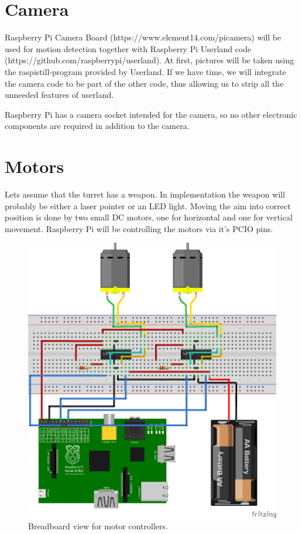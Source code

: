 \documentclass[english,11pt,twoside,a4paper]{article}
\begin{document}
\section{Camera}
Raspberry Pi Camera Board (https://www.element14.com/picamera) will be used for motion detection together with Raspberry Pi Userland code (https://github.com/raspberrypi/userland). At first, pictures will be taken using the raspistill-program provided by Userland. If we have time, we will integrate the camera code to be part of the other code, thus allowing us to strip all the unneeded features of userland.

Raspberry Pi has a camera socket intended for the camera, so no other electronic components are required in addition to the camera.

\section{Motors}
Lets assume that the turret has a weapon. In implementation the weapon will probably be either a laser pointer or an LED light. Moving the aim into correct position is done by two small DC motors, one for horizontal and one for vertical movement. Raspberry Pi will be controlling the motors via it's PCIO pins.

\begin{figure}
  \begin{center}
    \includegraphics[scale=0.75]{motor_controllers_l293d_bb.png}
    \caption{Breadboard view for motor controllers.}
  \end{center}
  \label{l293d_bb}
\end{figure}
\end{document}
